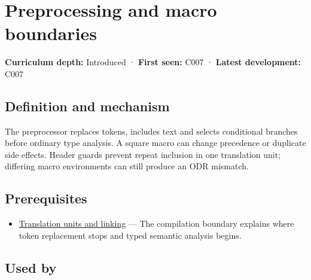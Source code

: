 \hypertarget{appendix-33c0a92ce855}{}\label{referencestart:appendix-33c0a92ce855}
\section{Preprocessing and macro boundaries}\label{appendix-33c0a92ce855-preprocessing-and-macro-boundaries}

\hypertarget{appendix-33c0a92ce855-preprocessing-and-macro-boundaries}{}

\textbf{Curriculum depth:} Introduced · \textbf{First seen:} C007 · \textbf{Latest development:} C007

\begin{allmightroledefinition}

\subsection{Definition and mechanism}\label{appendix-33c0a92ce855-definition-and-mechanism}

\hypertarget{appendix-33c0a92ce855-definition-and-mechanism}{}

The preprocessor replaces tokens, includes text and selects conditional branches before ordinary type analysis. A square macro can change precedence or duplicate side effects. Header guards prevent repeat inclusion in one translation unit; differing macro environments can still produce an ODR mismatch.

\end{allmightroledefinition}

\subsection{Prerequisites}\label{appendix-33c0a92ce855-prerequisites}

\hypertarget{appendix-33c0a92ce855-prerequisites}{}

\begin{itemize}
\tightlist
\item
  \hyperref[appendix-806686359e1b]{Translation units and linking} --- The compilation boundary explains where token replacement stops and typed semantic analysis begins.
\end{itemize}

\subsection{Used by}\label{appendix-33c0a92ce855-used-by}

